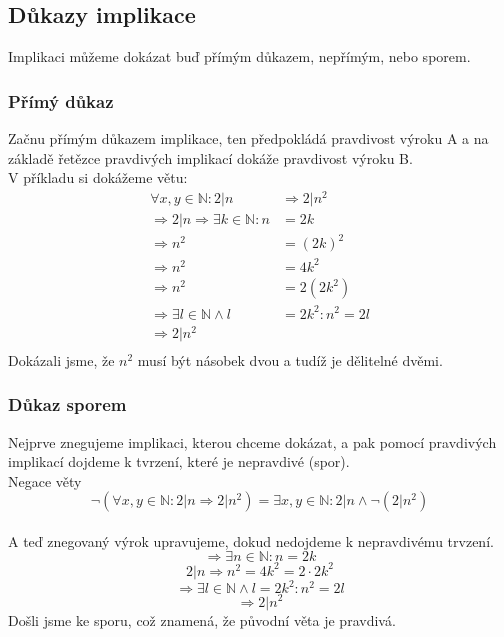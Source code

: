 \documentclass[12pt]{article}
\begin{document}
\subsection*{Důkazy implikace}
Implikaci můžeme dokázat buď přímým důkazem, nepřímým, nebo sporem.

\subsubsection*{Přímý důkaz} 
Začnu přímým důkazem implikace, ten předpokládá pravdivost výroku A a na základě řetězce pravdivých implikací dokáže pravdivost výroku B.\\
V příkladu si dokážeme větu:
\begin{align*}
\forall x,y \in \mathbb{N}: 2|n &\Rightarrow 2|n^2\\
\Rightarrow 2|n \Rightarrow \exists k \in \mathbb{N}: n &= 2k\\
\Rightarrow n^2 &= (2k)^2\\
\Rightarrow n^2 &= 4k^2\\
\Rightarrow n^2 &= 2(2k^2)\\
\Rightarrow \exists l \in \mathbb{N} \land l &= 2k^2: n^2 = 2l\\
\Rightarrow 2|n^2\\
\end{align*}
Dokázali jsme, že $n^2$ musí být násobek dvou a tudíž je dělitelné dvěmi.

\subsubsection*{Důkaz sporem}
Nejprve znegujeme implikaci, kterou chceme dokázat, a pak pomocí pravdivých implikací dojdeme k tvrzení, které je nepravdivé (spor).\\
Negace věty \[\neg(\forall x,y \in \mathbb{N}: 2|n \Rightarrow 2|n^2) = \exists x,y \in \mathbb{N}: 2|n \land \neg(2|n^2)\]\\
A teď znegovaný výrok upravujeme, dokud nedojdeme k nepravdivému trvzení.
\[\Rightarrow \exists n \in \mathbb{N}: n = 2k\]
\[2|n \Rightarrow n^2 = 4k^2 = 2\cdot 2k^2\]
\[\Rightarrow \exists l \in \mathbb{N} \land l = 2k^2: n^2 = 2l\]
\[\Rightarrow 2|n^2\]
Došli jsme ke sporu, což znamená, že původní věta je pravdivá.
\end{document}
